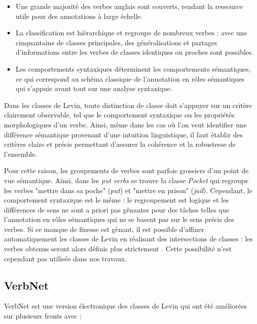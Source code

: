 \begin{itemize}

    \item Une grande majorité des verbes anglais sont couverts, rendant la
    ressource utile pour des annotations à large échelle.

    \item La classification est hiérarchique et regroupe de nombreux verbes :
    avec une cinquantaine de classes principales, des généralisations et
    partages d'informations entre les verbes de classes identiques ou proches
    sont possibles.

    \item Les comportements syntaxiques déterminent les comportements
    sémantiques, ce qui correspond au schéma classique de l'annotation en rôles
    sémantiques qui s'appuie avant tout sur une analyse syntaxique.

\end{itemize}

Dans les classes de Levin, toute distinction de classe doit s'appuyer sur un
critère clairement observable, tel que le comportement syntaxique ou les
propriétés morphologiques d'un verbe. Ainsi, même dans les cas où l'on veut
identifier une différence sémantique provenant d'une intuition linguistique, il
faut établir des critères clairs et précis permettant d'assurer la cohérence et
la robustesse de l'ensemble.

Pour cette raison, les groupements de verbes sont parfois grossiers d'un point
de vue sémantique. Ainsi, dans les \textit{put verbs} se trouve la classe
\textit{Pocket} qui regroupe les verbes "mettre dans sa poche" (\emph{put}) et
"mettre en prison" (\emph{jail}). Cependant, le comportement syntaxique est le
même : le regroupement est logique et les différences de sens ne sont a priori
pas gênantes pour des tâches telles que l'annotation en rôles sémantiques qui
ne se basent pas sur le sens précis des verbes. Si ce manque de finesse est
gênant, il est possible d'affiner automatiquement les classes de Levin en
réalisant des intersections de classes : les verbes obtenus seront alors
définis plus strictement \citep{dang1998investigating}. Cette possibilité n'est
cependant pas utilisée dans nos travaux.

\subsection{VerbNet}
\label{presentation_verbnet}

VerbNet \citep{kipperschuler2005verbnet} est une version électronique des
classes de Levin qui ont été améliorées sur plusieurs fronts avec :

